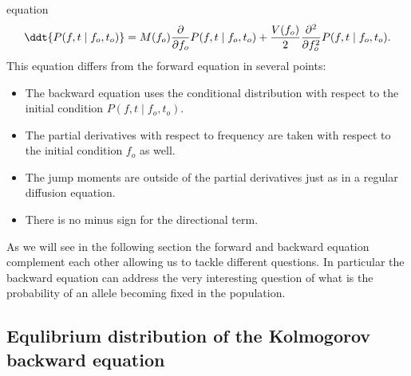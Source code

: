 equation
\begin{equation}
	\ddt{P(f, t \mid f_o, t_o)} =
	M(f_o) {\partial \over \partial f_o}P(f, t \mid f_o, t_o) +
	{V(f_o) \over 2} {\partial^2 \over \partial f_o^2} P(f, t \mid f_o, t_o).
	\label{eq_kolmogorov_backward}
\end{equation}
This equation differs from the forward equation in several points:
\begin{itemize}
	\item The backward equation uses the conditional distribution with respect to
	the initial condition $P(f, t \mid f_o, t_o)$.
	\item The partial derivatives with respect to frequency are taken with respect
	to the initial condition $f_o$ as well.
	\item The jump moments are outside of the partial derivatives just as in a
	regular diffusion equation.
	\item There is no minus sign for the directional term.
\end{itemize}
As we will see in the following section the forward and backward equation
complement each other allowing us to tackle different questions. In particular
the backward equation can address the very interesting question of what is the
probability of an allele becoming fixed in the population.

\subsection{Equlibrium distribution of the Kolmogorov backward equation}

